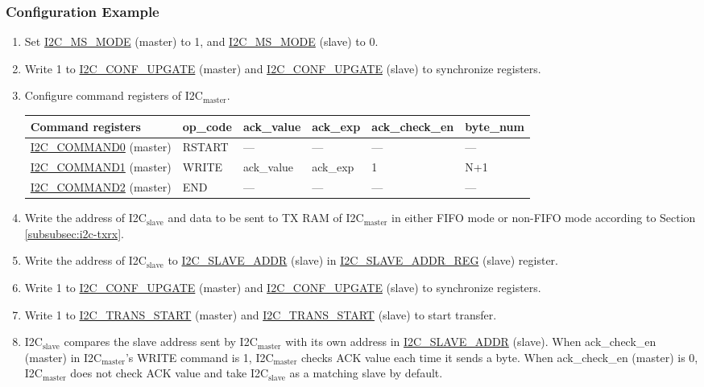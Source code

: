\documentclass[main\_\_EN.tex]{subfiles}
\begin{document}
\subsubsection{Configuration Example}

\begin{enumerate}
\item Set \hyperref[fielddesc:I2CMSMODE]{I2C\_MS\_MODE} (master) to 1, and \hyperref[fielddesc:I2CMSMODE]{I2C\_MS\_MODE} (slave) to 0.
\item Write 1 to \hyperref[fielddesc:I2CCONFUPGATE]{I2C\_CONF\_UPGATE} (master) and \hyperref[fielddesc:I2CCONFUPGATE]{I2C\_CONF\_UPGATE} (slave) to synchronize registers.
\item Configure command registers of I2C$_\text{master}$.
\begin{longtable}{ | p{5cm} | p{1.5cm} | p{1.5cm} | p{1.5cm} |p{2.5cm} | p{1.5cm} |}
\hline\rowcolor{lightgray}
Command registers& op\_code & ack\_value&ack\_exp&ack\_check\_en&byte\_num  \\ \hline
\hyperref[fielddesc:I2CCOMMAND0]{I2C\_COMMAND0} (master)& RSTART& ---&---&---&---  \\ \hline
\hyperref[fielddesc:I2CCOMMAND1]{I2C\_COMMAND1} (master)& WRITE& ack\_value&ack\_exp&1&N+1  \\ \hline
\hyperref[fielddesc:I2CCOMMAND2]{I2C\_COMMAND2} (master)& END& ---&---&---&---  \\ \hline
\end{longtable}
\item Write the address of I2C$_\text{slave}$ and data to be sent to TX RAM of I2C$_\text{master}$ in either FIFO mode or non-FIFO mode according to Section \ref{subsubsec:i2c-txrx}.
\item Write the address of I2C$_\text{slave}$ to \hyperref[fielddesc:I2CSLAVEADDR]{I2C\_SLAVE\_ADDR} (slave) in \hyperref[regdesc:I2CSLAVEADDRREG]{I2C\_SLAVE\_ADDR\_REG} (slave) register.
\item Write 1 to \hyperref[fielddesc:I2CCONFUPGATE]{I2C\_CONF\_UPGATE} (master) and \hyperref[fielddesc:I2CCONFUPGATE]{I2C\_CONF\_UPGATE} (slave) to synchronize registers.
\item Write 1 to \hyperref[fielddesc:I2CTRANSSTART]{I2C\_TRANS\_START} (master) and \hyperref[fielddesc:I2CTRANSSTART]{I2C\_TRANS\_START} (slave) to start transfer.
\item I2C$_\text{slave}$ compares the slave address sent by I2C$_\text{master}$ with its own address in \hyperref[fielddesc:I2CSLAVEADDR]{I2C\_SLAVE\_ADDR} (slave). When ack\_check\_en (master) in I2C$_\text{master}$'s WRITE command is 1, I2C$_\text{master}$ checks ACK value each time it sends a byte. When ack\_check\_en (master) is 0, I2C$_\text{master}$ does not check ACK value and take I2C$_\text{slave}$ as a matching slave by default.

\end{enumerate}
\end{document}
